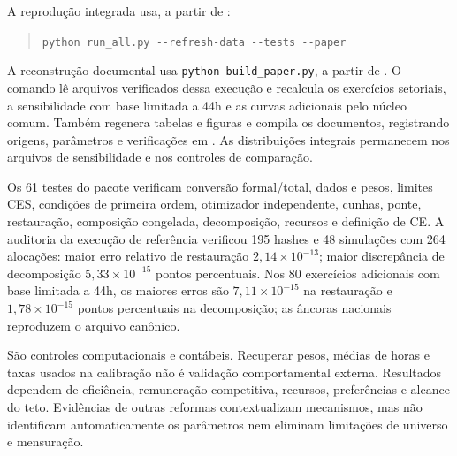 A reprodução integrada usa, a partir de :
\begin{quote}\normalsize
\verb|python run_all.py --refresh-data --tests --paper|
\end{quote}
A reconstrução documental usa \texttt{python build\_paper.py}, a partir de . O comando lê arquivos verificados dessa execução e recalcula os exercícios setoriais, a sensibilidade com base limitada a 44h e as curvas adicionais pelo núcleo comum. Também regenera tabelas e figuras e compila os documentos, registrando origens, parâmetros e verificações em . As distribuições integrais permanecem nos arquivos de sensibilidade e nos controles de comparação.

Os 61 testes do pacote verificam conversão formal/total, dados e pesos, limites CES, condições de primeira ordem, otimizador independente, cunhas, ponte, restauração, composição congelada, decomposição, recursos e definição de CE. A auditoria da execução de referência verificou 195 hashes e 48 simulações com 264 alocações: maior erro relativo de restauração $2{,}14\times10^{-13}$; maior discrepância de decomposição $5{,}33\times10^{-15}$ pontos percentuais. Nos 80 exercícios adicionais com base limitada a 44h, os maiores erros são $7{,}11\times10^{-15}$ na restauração e $1{,}78\times10^{-15}$ pontos percentuais na decomposição; as âncoras nacionais reproduzem o arquivo canônico.

São controles computacionais e contábeis. Recuperar pesos, médias de horas e taxas usados na calibração não é validação comportamental externa. Resultados dependem de eficiência, remuneração competitiva, recursos, preferências e alcance do teto. Evidências de outras reformas contextualizam mecanismos, mas não identificam automaticamente os parâmetros nem eliminam limitações de universo e mensuração.
